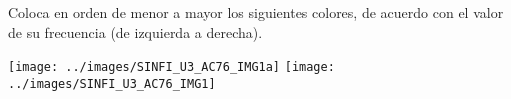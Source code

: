 Coloca en orden de menor a mayor los siguientes colores, de acuerdo con el valor de su frecuencia (de izquierda a derecha).
\begin{center}
     \qquad
     \qquad
     \qquad
     \qquad
     \qquad
     \qquad
    \ifprintanswers
        \texttt{[image: ../images/SINFI\_U3\_AC76\_IMG1a]}
    \else
        \texttt{[image: ../images/SINFI\_U3\_AC76\_IMG1]}
    \fi
\end{center}
